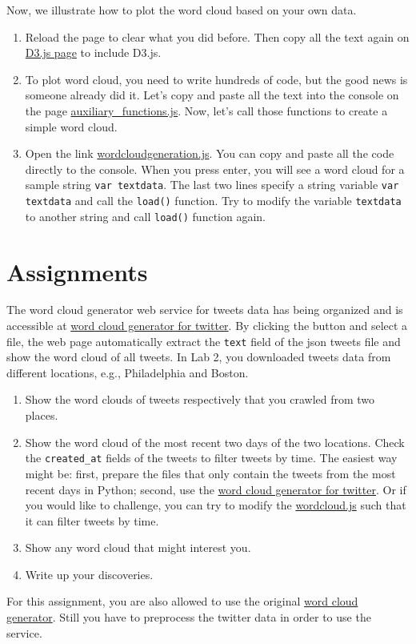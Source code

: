 \documentclass[a4paper, 11pt]{article}
\begin{document}
Now, we illustrate how to plot the word cloud based on your own data.
\begin{enumerate}
\item Reload the page to clear what you did before. Then copy all the text again on \href{https://raw.githubusercontent.com/mbostock/d3/master/d3.min.js}{D3.js page} to include D3.js.
\item To plot word cloud, you need to write hundreds of code, but the good news is someone already did it. Let's copy and paste all the text into the console on the page \href{http://nymph332088.github.io/CIS4340/labassignments/Lab5/auxiliary_functions.js}{auxiliary\_functions.js}. Now, let's call those functions to create a simple word cloud. 
\item Open the link \href{http://nymph332088.github.io/CIS4340/labassignments/Lab5/wordcloudgeneration.js}{wordcloudgeneration.js}. You can copy and paste all the code directly to the console. When you press enter, you will see a word cloud for a sample string \texttt{var textdata}. The last two lines specify a string variable \texttt{var textdata} and call the \texttt{load()} function. Try to modify the variable \texttt{textdata} to another string and call \texttt{load()} function again. 
\end{enumerate}



\section{Assignments}
The word cloud generator web service for tweets data has being organized and is accessible at \href{http://nymph332088.github.io/CIS4340/labassignments/Lab5/wordcloud.html}{word cloud generator for twitter}. By clicking the button and select a file, the web page automatically extract the \texttt{text} field of the json tweets file and show the word cloud of all tweets.
In Lab 2, you downloaded tweets data from different locations, e.g., Philadelphia and Boston.
\begin{enumerate}
\item Show the word clouds of tweets respectively that you crawled from two places.
\item Show the word cloud of the most recent two days of the two locations. Check the \texttt{created\_at} fields of the tweets to filter tweets by time. The easiest way might be: first, prepare the files that only contain the tweets from the most recent days in Python; second, use the \href{http://nymph332088.github.io/CIS4340/labassignments/Lab5/wordcloud.html}{word cloud generator for twitter}. Or if you would like to challenge, you can try to modify the \href{file:///home/nymph/nymph332088.github.io/CIS4340/labassignments/Lab5/wordcloud.js}{wordcloud.js} such that it can filter tweets by time.
\item Show any word cloud that might interest you.
\item Write up your discoveries.
\end{enumerate}
For this assignment, you are also allowed to use the original \href{http://www.jasondavies.com/wordcloud/}{word cloud generator}. Still you have to preprocess the twitter data in order to use the service.
\end{document}
